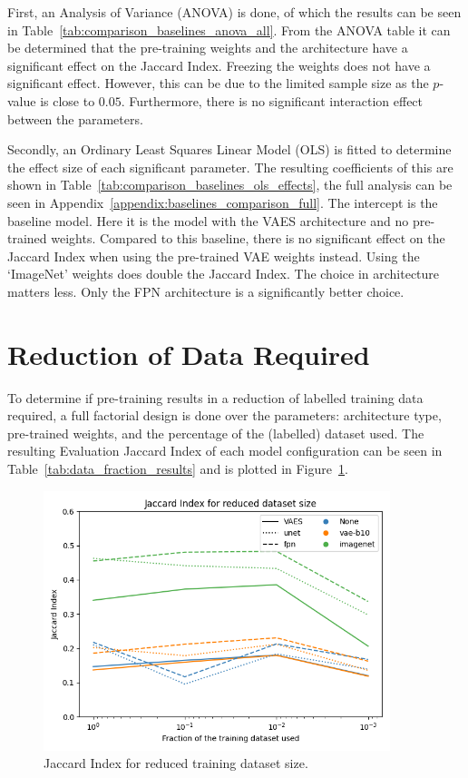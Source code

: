 First, an Analysis of Variance (ANOVA) is done, of which the results can be seen in Table~\ref{tab:comparison_baselines_anova_all}. From the ANOVA table it can be determined that the pre-training weights and the architecture have a significant effect on the Jaccard Index. Freezing the weights does not have a significant effect. However, this can be due to the limited sample size as the $p$-value is close to $0.05$. Furthermore, there is no significant interaction effect between the parameters. 

Secondly, an Ordinary Least Squares Linear Model (OLS) is fitted to determine the effect size of each significant parameter. The resulting coefficients of this are shown in Table~\ref{tab:comparison_baselines_ols_effects}, the full analysis can be seen in Appendix~\ref{appendix:baselines_comparison_full}. The intercept is the baseline model. Here it is the model with the VAES architecture and no pre-trained weights. Compared to this baseline, there is no significant effect on the Jaccard Index when using the pre-trained VAE weights instead. Using the `ImageNet' weights does double the Jaccard Index. The choice in architecture matters less. Only the FPN architecture is a significantly better choice. 



\section{Reduction of Data Required}
To determine if pre-training results in a reduction of labelled training data required, a full factorial design is done over the parameters: architecture type, pre-trained weights, and the percentage of the (labelled) dataset used. The resulting Evaluation Jaccard Index of each model configuration can be seen in Table~\ref{tab:data_fraction_results} and is plotted in Figure~\ref{fig:dataset-fraction-results}.


\begin{figure}[h]
    \centering
    \includegraphics[width=0.9\textwidth]{figures/data_percentage/line-plot.png}
    \caption{Jaccard Index for reduced training dataset size.}
    \label{fig:dataset-fraction-results}
\end{figure}

